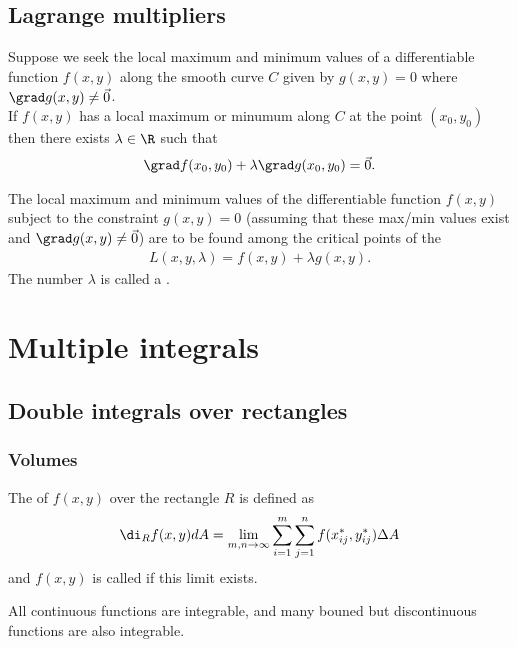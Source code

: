 \documentclass{article}
\begin{document}
\subsection{Lagrange multipliers}


\begin{theorem}
    Suppose we seek the local maximum and minimum values of a differentiable
    function $f(x,y)$ along the smooth curve $C$ given by $g(x,y)=0$ where
    $\grad g(x,y)\not=\vec 0$.\\
    If $f(x,y)$ has a local maximum or minumum along $C$ at the point
    $(x_0, y_0)$ then there exists $\lambda\in\R$ such that
    \begin{align*}
        \grad f(x_0, y_0) + \lambda\grad g(x_0, y_0) = \vec 0.
    \end{align*}
\end{theorem}
\begin{theorem}
    The local maximum and minimum values of the differentiable function
    $f(x,y)$ subject to the constraint $g(x,y)=0$ (assuming that these
    max/min values exist and $\grad g(x,y)\not=\vec 0$) are to be found
    among the critical points of the 
    \begin{align*}
        L(x,y,\lambda)=f(x,y)+\lambda g(x,y).
    \end{align*} 
    The number $\lambda$ is called a .
\end{theorem}



\section{Multiple integrals}



\subsection{Double integrals over rectangles}


\subsubsection{Volumes}

\begin{definition}
    The  of $f(x,y)$ over the rectangle $R$ is defined as
    \begin{align*}
        \di_R f(x,y)dA = \lim_{m,n\to\infty}\sum_{i=1}^m\sum_{j=1}^n f(x_{ij}^*, y_{ij}^*)\Delta A
    \end{align*}
    and $f(x,y)$ is called  if this limit exists.
\end{definition}
\begin{lemma}
    All continuous functions are integrable, and many bouned but
    discontinuous functions are also integrable.
\end{lemma}
\end{document}
